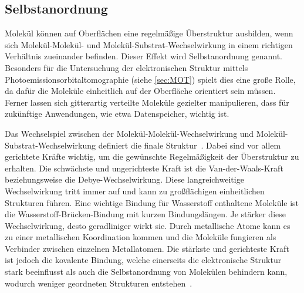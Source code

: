         \subsection{Selbstanordnung} \label{sec:Selbstanordnung}
            Molekül können auf Oberflächen eine regelmäßige Überstruktur ausbilden, wenn sich Molekül-Molekül- und Molekül-Substrat-Wechselwirkung in einem richtigen Verhältnis zueinander befinden.
            Dieser Effekt wird Selbstanordnung genannt.
            Besonders für die Untersuchung der elektronischen Struktur mittels Photoemissionsorbitaltomographie (siehe \autoref{sec:MOT}) spielt dies eine große Rolle, da dafür die Moleküle einheitlich auf der Oberfläche orientiert sein müssen.
            Ferner lassen sich gitterartig verteilte Moleküle gezielter manipulieren, dass für zukünftige Anwendungen, wie etwa Datenspeicher, wichtig ist.
            
            Das Wechselspiel zwischen der Molekül-Molekül-Wechselwirkung und Molekül-Substrat-Wechselwirkung definiert die finale Struktur~\cite{IF_1}.
            Dabei sind vor allem gerichtete Kräfte wichtig, um die gewünschte Regelmäßigkeit der Überstruktur zu erhalten.
            Die schwächste und ungerichteste Kraft ist die Van-der-Waals-Kraft beziehungsweise die Debye-Wechselwirkung. %
            Diese langreichweitige Wechselwirkung tritt immer auf und kann zu großflächigen einheitlichen Strukturen führen.
            Eine wichtige Bindung für Wasserstoff enthaltene Moleküle ist die Wasserstoff-Brücken-Bindung mit kurzen Bindungslängen. %
            Je stärker diese Wechselwirkung, desto geradliniger wirkt sie.
            Durch metallische Atome kann es zu einer metallischen Koordination kommen und die Moleküle fungieren als Verbinder zwischen einzelnen Metallatomen. %
            Die stärkste und gerichteste Kraft ist jedoch die kovalente Bindung, welche einerseits die elektronische Struktur stark beeinflusst als auch die Selbstanordnung von Molekülen behindern kann, wodurch weniger geordneten Strukturen entstehen~\cite{IF_1}.

